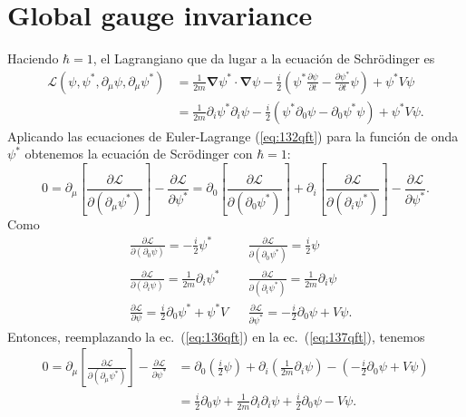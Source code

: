 \section{Global gauge invariance}
\label{sec:glob-gauge-invar}
Haciendo $\hbar=1$, el Lagrangiano que da lugar a la ecuación de Schrödinger es
\begin{align}
\label{eq:5qft}
  \mathcal{L}(\psi,\psi^*,\partial_\mu\psi,\partial_\mu\psi^*)&=\frac{1}{2m}\boldsymbol{\nabla}\psi^*\cdot\boldsymbol{\nabla}\psi-\frac{i}{2}
  \left(
\psi^*\frac{\partial\psi}{\partial t}-\frac{\partial\psi^*}{\partial t}\psi
  \right)+\psi^*V\psi\\
&=\frac{1}{2m}\partial_i\psi^*\partial_i\psi-\frac{i}{2}
  \left(\psi^*\partial_0\psi-\partial_0\psi^*\psi\right)+\psi^*V\psi.\nonumber
\end{align}
Aplicando las ecuaciones de Euler-Lagrange (\ref{eq:132qft}) para
la función de onda $\psi^*$ obtenemos la ecuación de Scrödinger con $\hbar=1$:
\begin{equation}
  \label{eq:137qft}
    0=\partial_\mu\left[\frac{\partial\mathcal{L}}{\partial(\partial_\mu\psi^*)}\right]-\frac{\partial\mathcal{L}}{\partial\psi^*}=
  \partial_0\left[\frac{\partial\mathcal{L}}{\partial(\partial_0\psi^*)}\right]+  
\partial_i\left[\frac{\partial\mathcal{L}}{\partial(\partial_i\psi^*)}\right]-\frac{\partial\mathcal{L}}{\partial\psi^*}.
\end{equation}
Como
\begin{align}
  \label{eq:136qft}
  &\frac{\partial\mathcal{L}}{\partial(\partial_0\psi)}=-\frac{i}{2}\psi^*&&\frac{\partial\mathcal{L}}{\partial(\partial_0\psi^*)}=\frac{i}{2}\psi\nonumber\\
  &\frac{\partial\mathcal{L}}{\partial(\partial_i\psi)}=\frac{1}{2m}\partial_i\psi^*&&\frac{\partial\mathcal{L}}{\partial(\partial_i\psi^*)}=\frac{1}{2m}\partial_i\psi\\
  &\frac{\partial\mathcal{L}}{\partial\psi}=\frac{i}{2}\partial_0\psi^*+\psi^*V&&\frac{\partial\mathcal{L}}{\partial\psi^*}=-\frac{i}{2}\partial_0\psi+V\psi.\nonumber
\end{align}
Entonces, reemplazando la ec.~(\ref{eq:136qft}) en la ec.~(\ref{eq:137qft}), tenemos
\begin{align}
 0=\partial_\mu\left[\frac{\partial\mathcal{L}}{\partial(\partial_\mu\psi^*)}\right]-\frac{\partial\mathcal{L}}{\partial\psi^*}
 &=\partial_0\left(\frac{i}{2}\psi\right)+\partial_i\left(\frac{1}{2m}\partial_i\psi\right)
  -\left(-\frac{i}{2}\partial_0\psi+V\psi\right)\nonumber\\
  &=\frac{i}{2}\partial_0\psi+\frac{1}{2m}\partial_i\partial_i\psi+\frac{i}{2}\partial_0\psi-V\psi.
\end{align}

